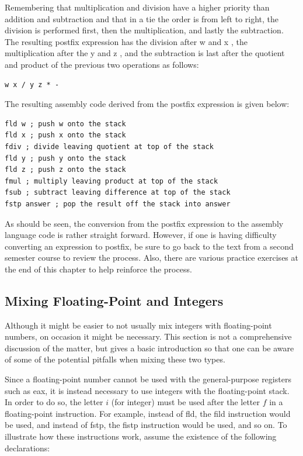 \documentclass[10pt]{article}
\begin{document}
Remembering that multiplication and division have a higher priority than addition and subtraction and that in a tie the order is from left to right, the division is performed first, then the multiplication, and lastly the subtraction. The resulting postfix expression has the division after w and x , the multiplication after the y and z , and the subtraction is last after the quotient and product of the previous two operations as follows:

\begin{verbatim}
w x / y z * -
\end{verbatim}

The resulting assembly code derived from the postfix expression is given below:

\begin{verbatim}
fld w ; push w onto the stack
fld x ; push x onto the stack
fdiv ; divide leaving quotient at top of the stack
fld y ; push y onto the stack
fld z ; push z onto the stack
fmul ; multiply leaving product at top of the stack
fsub ; subtract leaving difference at top of the stack
fstp answer ; pop the result off the stack into answer
\end{verbatim}

As should be seen, the conversion from the postfix expression to the assembly language code is rather straight forward. However, if one is having difficulty converting an expression to postfix, be sure to go back to the text from a second semester course to review the process. Also, there are various practice exercises at the end of this chapter to help reinforce the process.

\subsection*{Mixing Floating-Point and Integers}
Although it might be easier to not usually mix integers with floating-point numbers, on occasion it might be necessary. This section is not a comprehensive discussion of the matter, but gives a basic introduction so that one can be aware of some of the potential pitfalls when mixing these two types.

Since a floating-point number cannot be used with the general-purpose registers such as eax, it is instead necessary to use integers with the floating-point stack. In order to do so, the letter $i$ (for integer) must be used after the letter $f$ in a floating-point instruction. For example, instead of fld, the fild instruction would be used, and instead of fstp, the fistp instruction would be used, and so on. To illustrate how these instructions work, assume the existence of the following declarations:
\end{document}
